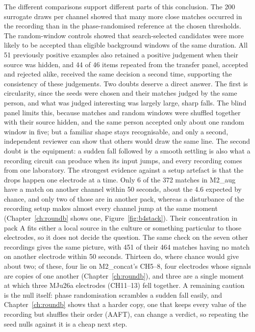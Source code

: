 The different comparisons support different parts of this conclusion. The 200 surrogate draws per channel showed that many more close matches occurred in the recording than in the phase-randomised reference at the chosen thresholds. The random-window controls showed that search-selected candidates were more likely to be accepted than eligible background windows of the same duration. All 51 previously positive examples also retained a positive judgement when their source was hidden, and 44 of 46 items repeated from the transfer panel, accepted and rejected alike, received the same decision a second time, supporting the consistency of these judgements. Two doubts deserve a direct answer. The first is circularity, since the seeds were chosen and their matches judged by the same person, and what was judged interesting was largely large, sharp falls. The blind panel limits this, because matches and random windows were shuffled together with their source hidden, and the same person accepted only about one random window in five; but a familiar shape stays recognisable, and only a second, independent reviewer can show that others would draw the same line. The second doubt is the equipment: a sudden fall followed by a smooth settling is also what a recording circuit can produce when its input jumps, and every recording comes from one laboratory. The strongest evidence against a setup artefact is that the drops happen one electrode at a time. Only 6 of the 372 matches in M2\_aug have a match on another channel within 50 seconds, about the 4.6 expected by chance, and only two of those are in another pack, whereas a disturbance of the recording setup makes almost every channel jump at the same moment (Chapter~\ref{ch:roundb} shows one, Figure~\ref{fig:b4stack}). Their concentration in pack A fits either a local source in the culture or something particular to those electrodes, so it does not decide the question. The same check on the seven other recordings gives the same picture, with 451 of their 464 matches having no match on another electrode within 50 seconds. Thirteen do, where chance would give about two; of these, four lie on M2\_concat's CH5--8, four electrodes whose signals are copies of one another (Chapter~\ref{ch:roundb}), and three are a single moment at which three MJu26a electrodes (CH11--13) fell together. A remaining caution is the null itself: phase randomisation scrambles a sudden fall easily, and Chapter~\ref{ch:roundb} shows that a harder copy, one that keeps every value of the recording but shuffles their order (AAFT), can change a verdict, so repeating the seed nulls against it is a cheap next step.

